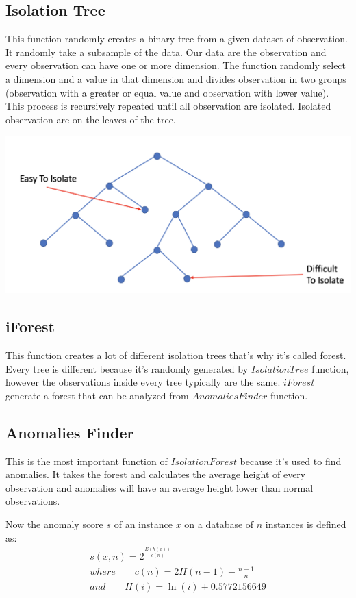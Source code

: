 \documentclass[journal]{IEEEtran}
\begin{document}
\subsection{Isolation Tree}
This function randomly creates a binary tree from a given dataset of observation. It randomly take a subsample of the data. Our data are the observation and every observation can have one or more dimension.
The function randomly select a dimension and a value in that dimension and divides observation in two groups (observation with a greater or equal value and observation with lower value). This process is recursively repeated until all observation are isolated. Isolated observation are on the leaves of the tree.

\begin{center}
\includegraphics[width=\columnwidth]{albero.png}
\end{center}

\subsection{iForest}
This function creates a lot of different isolation trees that's why it’s called forest. Every tree is different because it’s randomly generated by \(IsolationTree\) function, however the observations inside every tree typically are the same. \(iForest\) generate a forest that can be analyzed from \(Anomalies Finder\) function.

\subsection{Anomalies Finder}
This is the most important function of \(Isolation Forest\) because it’s used to find anomalies. It takes the forest and calculates the average height of every observation  and anomalies will have an average height lower than normal observations.

Now the anomaly score \(s\) of an instance \(x\) on a database of \(n\) instances is defined as:
\begin{gather*}
s(x,n)=2^ { \frac {{E(h(x))}} {c(n)} } \\
where \qquad c(n)=2H(n - 1) - \frac{n - 1}{n} \\
and \qquad H(i)=\ln (i) + 0.5772156649
\end{gather*}
\end{document}
